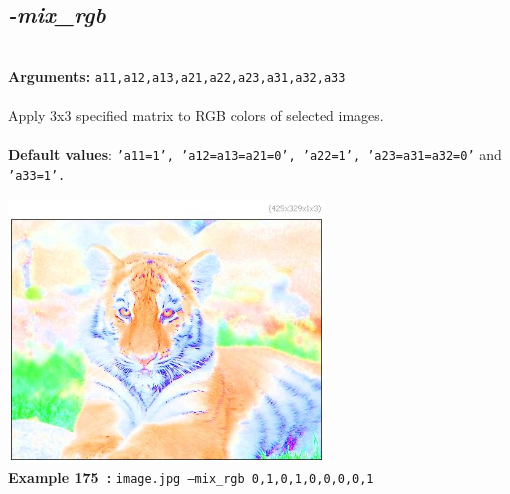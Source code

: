 \documentclass[a4paper,11pt,twoside]{book}
\begin{document}
\subsection{\emph{-mix\_rgb} }\vspace*{-0.5em}
~\\\textbf{Arguments: } 
{\small \texttt{a11,a12,a13,a21,a22,a23,a31,a32,a33}}\\~\\
Apply 3x3 specified matrix to RGB colors of selected images.
~\\~\\\textbf{Default values}: {\small \texttt{'a11=1', 'a12=a13=a21=0', 'a22=1', 'a23=a31=a32=0'} and \texttt{'a33=1'.}}
\begin{center}\includegraphics[keepaspectratio=true,height=7cm,width=\textwidth]{img/gmic_def175.jpg}\\
{\footnotesize \textbf{Example 175~:} \texttt{image.jpg --mix\_rgb 0,1,0,1,0,0,0,0,1}}
\end{center}
\end{document}
